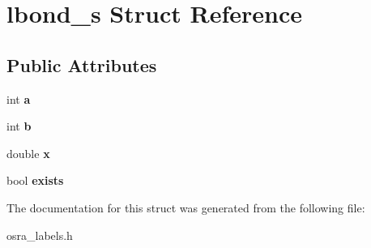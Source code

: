 \hypertarget{structlbond__s}{\section{lbond\-\_\-s Struct Reference}
\label{structlbond__s}
}
\subsection*{Public Attributes}
\begin{DoxyCompactItemize}
\item 
\hypertarget{structlbond__s_a3b682dcb0fea180f10c7f0e15d167b12}{int {\bfseries a}}\label{structlbond__s_a3b682dcb0fea180f10c7f0e15d167b12}

\item 
\hypertarget{structlbond__s_a56c460f7c6e29cebdb007ccd201bca18}{int {\bfseries b}}\label{structlbond__s_a56c460f7c6e29cebdb007ccd201bca18}

\item 
\hypertarget{structlbond__s_aa9a48192f336ba3a0f8fa30e8b9ff7f7}{double {\bfseries x}}\label{structlbond__s_aa9a48192f336ba3a0f8fa30e8b9ff7f7}

\item 
\hypertarget{structlbond__s_a9f475d6c6d85abb69684d116ed3457fd}{bool {\bfseries exists}}\label{structlbond__s_a9f475d6c6d85abb69684d116ed3457fd}

\end{DoxyCompactItemize}


The documentation for this struct was generated from the following file\-:\begin{DoxyCompactItemize}
\item 
osra\-\_\-labels.\-h\end{DoxyCompactItemize}
